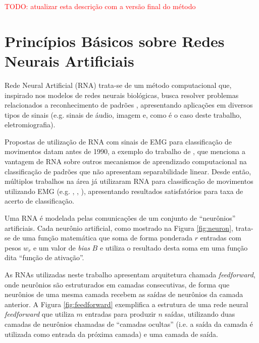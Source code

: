 

\textcolor{red}{TODO: atualizar esta descrição com a versão final do método}

		\section{Princípios Básicos sobre Redes Neurais Artificiais}
Rede Neural Artificial (RNA) trata-se de um método computacional que, inspirado nos modelos de redes neurais biológicas, busca resolver problemas relacionados a reconhecimento de padrões \cite{yegnanarayana2009artificial}, apresentando aplicações em diversos tipos de sinais (e.g. sinais de áudio, imagem e, como é o caso deste trabalho, eletromiografia).

Propostas de utilização de RNA com sinais de EMG para classificação de movimentos datam antes de 1990, a exemplo do trabalho de \cite{Hiraiwa1989}, que menciona a vantagem de RNA sobre outros mecanismos de aprendizado computacional na classificação de padrões que não apresentam separabilidade linear. Desde então, múltiplos trabalhos na área já utilizaram RNA para classificação de movimentos utilizando EMG (e.g. \cite{Hudgins1993}, \cite{Subasi2006}, \cite{Bu2003}), apresentando resultados satisfatórios para taxa de acerto de classificação.

Uma RNA é modelada pelas comunicações de um conjunto de ``neurônios'' artificiais. Cada neurônio artificial, como mostrado na Figura \ref{fig:neuron}, trata-se de uma função matemática que soma de forma ponderada $r$ entradas com pesos $w_r$ e um valor de \emph{bias} $B$ e utiliza o resultado desta soma em uma função dita ``função de ativação''.



As RNAs utilizadas neste trabalho apresentam arquitetura chamada \emph{feedforward}, onde neurônios são estruturados em camadas consecutivas, de forma que neurônios de uma mesma camada recebem as saídas de neurônios da camada anterior. A Figura \ref{fig:feedforward} exemplifica a estrutura de uma rede neural \emph{feedforward} que utiliza $m$ entradas para produzir $n$ saídas, utilizando duas camadas de neurônios chamadas de ``camadas ocultas'' (i.e. a saída da camada é utilizada como entrada da próxima camada) e uma camada de saída.



